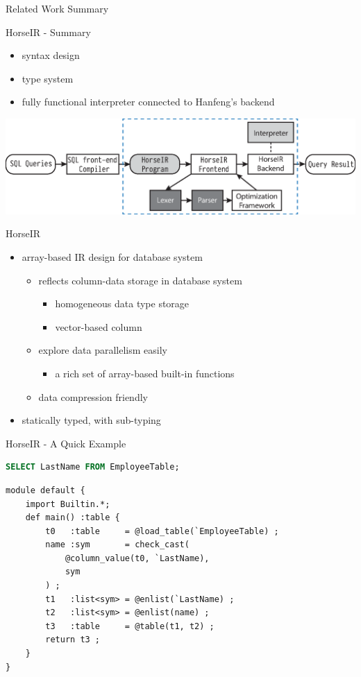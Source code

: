\documentclass{beamer}
\begin{document}
\begin{frame}{Related Work Summary} 

\end{frame}


\begin{frame}{HorseIR - Summary}
\begin{itemize}
    \item syntax design
    \item type system
    \item fully functional interpreter connected to Hanfeng's backend
\end{itemize}
\includegraphics[width=\textwidth]{horse-finished}
\end{frame}

\begin{frame}{HorseIR}
\begin{itemize}
\item array-based IR design for database system
      \begin{itemize}
      \item reflects column-data storage in database system 
      \begin{itemize} 
      \item homogeneous data type storage 
      \item vector-based column
      \end{itemize}
      \item explore data parallelism easily 
      \begin{itemize}
      \item a rich set of array-based built-in functions
      \end{itemize}
      \item data compression friendly
      \end{itemize}
\item statically typed, with sub-typing
\end{itemize}
\end{frame}

\begin{frame}[fragile]{HorseIR - A Quick Example}
\begin{lstlisting}[language=SQL]
SELECT LastName FROM EmployeeTable;
\end{lstlisting}
\begin{lstlisting}[basicstyle=\small]
module default {
    import Builtin.*;
    def main() :table {
        t0   :table     = @load_table(`EmployeeTable) ;
        name :sym       = check_cast(
            @column_value(t0, `LastName), 
            sym
        ) ;
        t1   :list<sym> = @enlist(`LastName) ;
        t2   :list<sym> = @enlist(name) ;
        t3   :table     = @table(t1, t2) ;
        return t3 ;
    }
}
\end{lstlisting}
\end{frame}
\end{document}
